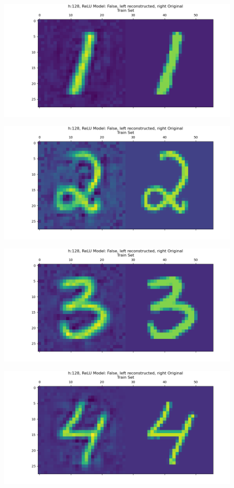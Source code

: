 \documentclass[]{article}
\begin{document}
            \begin{center}
                \includegraphics*[width=12cm]{./A4plots/06-46-47-h-128-lin-digit-1.png}
            \end{center}
            \begin{center}
                \includegraphics*[width=12cm]{./A4plots/06-46-47-h-128-lin-digit-2.png}
            \end{center}
            \begin{center}
                \includegraphics*[width=12cm]{./A4plots/06-46-47-h-128-lin-digit-3.png}
            \end{center}
            \begin{center}
                \includegraphics*[width=12cm]{./A4plots/06-46-48-h-128-lin-digit-4.png}
            \end{center}
\end{document}
